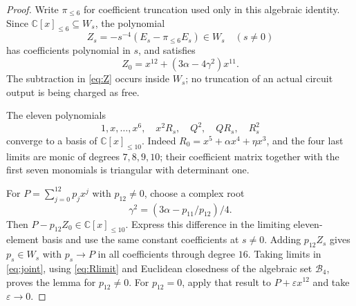 \documentclass[11pt]{article}
\newcommand{\C}{\mathbb C}
\newcommand{\V}[1]{\C[x]_{\le #1}}
\begin{document}
\begin{proof}
Write $\pi_{\le6}$ for coefficient truncation used only in this algebraic
identity. Since $\V6\subseteq W_s$, the polynomial
\begin{equation}\label{eq:Z}
 Z_s=-s^{-4}(E_s-\pi_{\le6}E_s)\in W_s\quad(s\ne0)
\end{equation}
has coefficients polynomial in $s$, and satisfies
\begin{equation}\label{eq:Zlimit}
 Z_0=x^{12}+(3\alpha-4\gamma^2)x^{11}.
\end{equation}
The subtraction in \eqref{eq:Z} occurs inside $W_s$; no truncation of an
actual circuit output is being charged as free.

The eleven polynomials
\[
 1,x,\ldots,x^6,\quad x^2R_s,\quad Q^2,\quad QR_s,\quad R_s^2
\]
converge to a basis of $\V{10}$. Indeed $R_0=x^5+\alpha x^4+\eta x^3$,
and the four last limits are monic of degrees $7,8,9,10$; their coefficient
matrix together with the first seven monomials is triangular with determinant
one.

For $P=\sum_{j=0}^{12}p_jx^j$ with $p_{12}\ne0$, choose a complex root
\[
 \gamma^2=(3\alpha-p_{11}/p_{12})/4.
\]
Then $P-p_{12}Z_0\in\V{10}$. Express this difference in the limiting
eleven-element basis and use the same constant coefficients at $s\ne0$.
Adding $p_{12}Z_s$ gives $p_s\in W_s$ with $p_s\to P$ in all coefficients
through degree $16$. Taking limits in \eqref{eq:joint}, using
\eqref{eq:Rlimit} and Euclidean closedness of the algebraic set
$\mathcal B_4$, proves the lemma for $p_{12}\ne0$. For $p_{12}=0$, apply
that result to $P+\varepsilon x^{12}$ and take $\varepsilon\to0$.
\end{proof}
\end{document}
